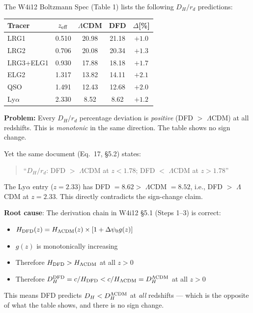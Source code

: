 \documentclass[11pt,a4paper]{article}
\newcommand{\LCDM}{$\Lambda$CDM}
\begin{document}
\begin{tensionbox}

The W4i12 Boltzmann Spec (Table 1) lists the following $D_H/r_d$ predictions:

\begin{center}
\begin{tabular}{lcccc}
\toprule
\textbf{Tracer} & $z_{\rm eff}$ & \textbf{\LCDM} & \textbf{DFD} &
$\Delta$[\%] \\
\midrule
LRG1 & 0.510 & 20.98 & 21.18 & $+1.0$ \\
LRG2 & 0.706 & 20.08 & 20.34 & $+1.3$ \\
LRG3+ELG1 & 0.930 & 17.88 & 18.18 & $+1.7$ \\
ELG2 & 1.317 & 13.82 & 14.11 & $+2.1$ \\
QSO & 1.491 & 12.43 & 12.68 & $+2.0$ \\
Ly$\alpha$ & 2.330 & 8.52 & 8.62 & $+1.2$ \\
\bottomrule
\end{tabular}
\end{center}

\textbf{Problem:} Every $D_H/r_d$ percentage deviation is \emph{positive}
(DFD $>$ \LCDM) at all redshifts. This is \emph{monotonic} in the same
direction. The table shows no sign change.

Yet the same document (Eq.~17, \S5.2) states:
\begin{quote}
``$D_H/r_d$: DFD $>$ \LCDM{} at $z < 1.78$; DFD $<$ \LCDM{} at $z > 1.78$''
\end{quote}

The Ly$\alpha$ entry ($z = 2.33$) has DFD $= 8.62 >$ \LCDM{} $= 8.52$,
i.e., DFD $>$ \LCDM{} at $z = 2.33$. This directly contradicts the
sign-change claim.

\textbf{Root cause}: The derivation chain in W4i12 \S5.1 (Steps 1--3) is
correct:
\begin{itemize}[nosep]
\item $H_{\rm DFD}(z) = H_{\Lambda\rm CDM}(z) \times
  [1 + \Delta\psi_0 g(z)]$
\item $g(z)$ is monotonically increasing
\item Therefore $H_{\rm DFD} > H_{\Lambda\rm CDM}$ at all $z > 0$
\item Therefore $D_H^{\rm DFD} = c/H_{\rm DFD} <
  c/H_{\Lambda\rm CDM} = D_H^{\Lambda\rm CDM}$ at all $z > 0$
\end{itemize}

This means DFD predicts $D_H < D_H^{\Lambda\rm CDM}$ at \emph{all}
redshifts --- which is the opposite of what the table shows, and there
is no sign change.


\end{tensionbox}
\end{document}
